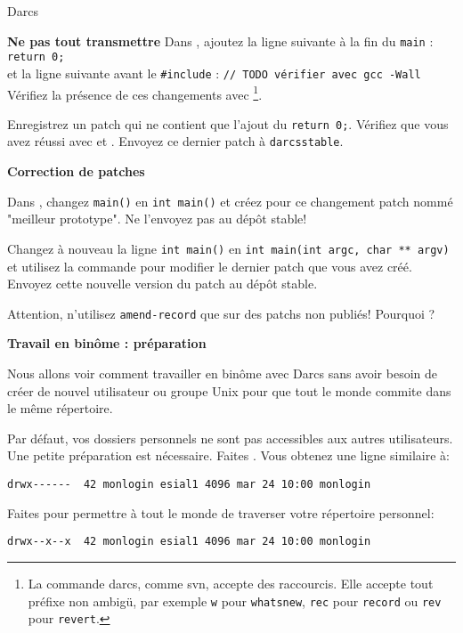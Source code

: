 \documentclass[10pt]{article}\usepackage[nu]{esial}
\begin{document}
\begin{part}{Darcs}
\begin{Exercice}{\bf Ne pas tout transmettre}
Dans , ajoutez la ligne suivante à la fin du {\tt main} :\hfill
{\tt return 0;}\\
et la ligne suivante avant le {\tt \#include} :\hfill
{\tt // TODO vérifier avec gcc -Wall}\\
Vérifiez la présence de ces changements avec 
\footnote{La commande darcs, comme svn, accepte des raccourcis. Elle accepte
tout préfixe non ambigü, par exemple {\tt w} pour {\tt whatsnew},
{\tt rec} pour {\tt record} ou {\tt rev} pour {\tt revert}.}.

Enregistrez un patch qui ne contient que l'ajout du {\tt return 0;}.
Vérifiez que vous avez réussi avec  et .
Envoyez ce dernier patch à {\tt darcsstable}.
\end{Exercice}

\begin{Exercice}{\bf Correction de patches}

Dans , changez {\tt main()} en {\tt int main()} et
créez pour ce changement patch nommé "meilleur prototype". Ne l'envoyez pas au dépôt
stable!

Changez à nouveau la ligne {\tt int main()} en {\tt int main(int argc, char ** argv)}
et utilisez la commande  pour modifier le dernier patch que vous
avez créé. Envoyez cette nouvelle version du patch au dépôt stable.

Attention, n'utilisez {\tt amend-record} que sur des patchs non publiés! Pourquoi ?
\end{Exercice}

\begin{Exercice}{\bf Travail en binôme : préparation}

Nous allons voir comment travailler en binôme avec Darcs
sans avoir besoin de créer de nouvel utilisateur ou groupe Unix pour
que tout le monde commite dans le même répertoire.

Par défaut, vos dossiers personnels ne sont pas accessibles
aux autres utilisateurs. Une petite préparation est nécessaire. 
Faites .
Vous obtenez une ligne similaire à:
\begin{verbatim}
drwx------  42 monlogin esial1 4096 mar 24 10:00 monlogin
\end{verbatim}

Faites  pour permettre à tout le monde de traverser
votre répertoire personnel:

\begin{verbatim}
drwx--x--x  42 monlogin esial1 4096 mar 24 10:00 monlogin
\end{verbatim}


\end{Exercice}
\end{part}
\end{document}
